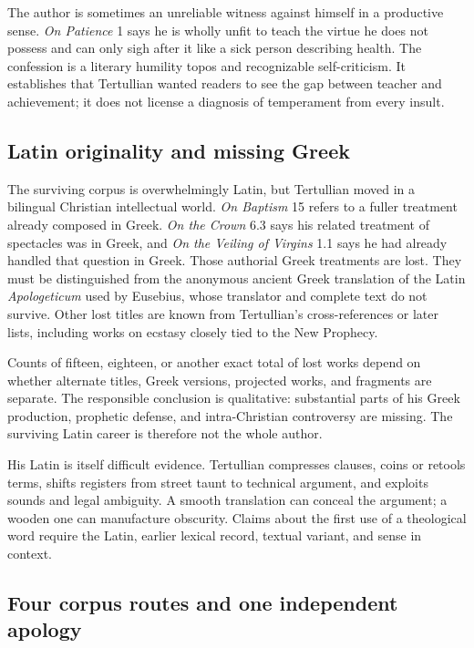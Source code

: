 The author is sometimes an unreliable witness against himself in a productive
sense. \emph{On Patience} 1 says he is wholly unfit to teach the virtue he does
not possess and can only sigh after it like a sick person describing health.
The confession is a literary humility topos and recognizable self-criticism.
It establishes that Tertullian wanted readers to see the gap between teacher
and achievement; it does not license a diagnosis of temperament from every
insult.

\subsection{Latin originality and missing Greek}

The surviving corpus is overwhelmingly Latin, but Tertullian moved in a
bilingual Christian intellectual world. \emph{On Baptism} 15 refers to a
fuller treatment already composed in Greek. \emph{On the Crown} 6.3 says his
related treatment of spectacles was in Greek, and \emph{On the Veiling of
Virgins} 1.1 says he had already handled that question in Greek. Those
authorial Greek treatments are lost. They must be distinguished from the
anonymous ancient Greek translation of the Latin \emph{Apologeticum} used by
Eusebius, whose translator and complete text do not survive. Other lost titles
are known from Tertullian's cross-references or later lists, including works on
ecstasy closely tied to the New Prophecy.

Counts of fifteen, eighteen, or another exact total of lost works depend on
whether alternate titles, Greek versions, projected works, and fragments are
separate. The responsible conclusion is qualitative: substantial parts of his
Greek production, prophetic defense, and intra-Christian controversy are
missing. The surviving Latin career is therefore not the whole author.

His Latin is itself difficult evidence. Tertullian compresses clauses, coins or
retools terms, shifts registers from street taunt to technical argument, and
exploits sounds and legal ambiguity. A smooth translation can conceal the
argument; a wooden one can manufacture obscurity. Claims about the first use of
a theological word require the Latin, earlier lexical record, textual variant,
and sense in context.

\subsection{Four corpus routes and one independent apology}

